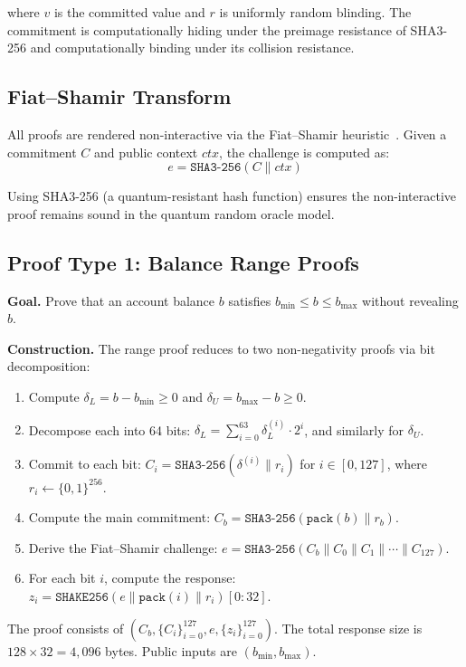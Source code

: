 \documentclass[conference,10pt]{IEEEtran}
\newcommand{\SHAKE}{\texttt{SHAKE256}}
\newcommand{\SHA}{\texttt{SHA3-256}}
\begin{document}
where $v$ is the committed value and $r$ is uniformly random blinding. The commitment is computationally hiding under the preimage resistance of SHA3-256 and computationally binding under its collision resistance.

\subsection{Fiat--Shamir Transform}

All proofs are rendered non-interactive via the Fiat--Shamir heuristic~\cite{fiatShamir1986}. Given a commitment $C$ and public context $ctx$, the challenge is computed as:
\begin{equation}
e = \SHA(C \| ctx)
\label{eq:challenge}
\end{equation}

Using SHA3-256 (a quantum-resistant hash function) ensures the non-interactive proof remains sound in the quantum random oracle model.

\subsection{Proof Type 1: Balance Range Proofs}

\textbf{Goal.} Prove that an account balance $b$ satisfies $b_{\min} \leq b \leq b_{\max}$ without revealing $b$.

\textbf{Construction.} The range proof reduces to two non-negativity proofs via bit decomposition:
\begin{enumerate}
\item Compute $\delta_L = b - b_{\min} \geq 0$ and $\delta_U = b_{\max} - b \geq 0$.
\item Decompose each into 64 bits: $\delta_L = \sum_{i=0}^{63} \delta_L^{(i)} \cdot 2^i$, and similarly for $\delta_U$.
\item Commit to each bit: $C_i = \SHA(\delta^{(i)} \| r_i)$ for $i \in [0, 127]$, where $r_i \leftarrow \{0,1\}^{256}$.
\item Compute the main commitment: $C_b = \SHA(\texttt{pack}(b) \| r_b)$.
\item Derive the Fiat--Shamir challenge: $e = \SHA(C_b \| C_0 \| C_1 \| \cdots \| C_{127})$.
\item For each bit $i$, compute the response: $z_i = \SHAKE(e \| \texttt{pack}(i) \| r_i)[0{:}32]$.
\end{enumerate}

The proof consists of $(C_b, \{C_i\}_{i=0}^{127}, e, \{z_i\}_{i=0}^{127})$. The total response size is $128 \times 32 = 4{,}096$ bytes. Public inputs are $(b_{\min}, b_{\max})$.
\end{document}
